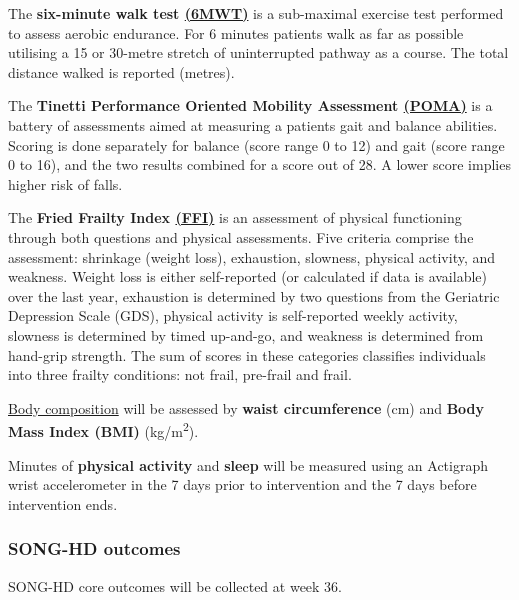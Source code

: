 \documentclass[11pt,parskip=half-]{scrartcl}
\begin{document}
\label{outcome:6mwt}
The \textbf{six-minute walk test \hyperref[analysis:6mwt]{(6MWT)}} \cites{butland1982two}{buvcar2016six} is a sub-maximal exercise test performed to assess aerobic endurance. For 6 minutes patients walk as far as possible utilising a 15 or 30-metre stretch of uninterrupted pathway as a course. The total distance walked is reported (metres).

\label{outcome:poma}
The \textbf{Tinetti Performance Oriented Mobility Assessment \hyperref[analysis:poma]{(POMA)}} \cites{tinetti1986fall}{wyngaert2020associations} is a battery of assessments aimed at measuring a patients gait and balance abilities. Scoring is done separately for balance (score range 0 to 12) and gait (score range 0 to 16), and the two results combined for a score out of 28. A lower score implies higher risk of falls.

\label{outcome:ffi}
The \textbf{Fried Frailty Index \hyperref[analysis:ffi]{(FFI)}} \cites{fried2001frailty}{het2015fried} is an assessment of physical functioning through both questions and physical assessments. Five criteria comprise the assessment: shrinkage (weight loss), exhaustion, slowness, physical activity, and weakness. Weight loss is either self-reported (or calculated if data is available) over the last year, exhaustion is determined by two questions from the Geriatric Depression Scale (GDS), physical activity is self-reported weekly activity, slowness is determined by timed up-and-go, and weakness is determined from hand-grip strength.
The sum of scores in these categories classifies individuals into three frailty conditions: not frail, pre-frail and frail.

\label{outcome:body}
\hyperref[analysis:body]{Body composition} will be assessed by \textbf{waist circumference} (cm) and \textbf{Body Mass Index (BMI)} (kg/m\textsuperscript{2}).

\label{outcome:actigraph}
Minutes of \textbf{physical activity} and \textbf{sleep} will be measured using an Actigraph wrist accelerometer in the 7 days prior to intervention and the 7 days before intervention ends.

\subsubsection{SONG-HD outcomes}\label{song-outcomes}

SONG-HD core outcomes will be collected at week 36.
\end{document}
